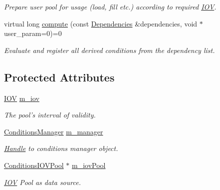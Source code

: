 \begin{DoxyCompactItemize}
\begin{DoxyCompactList}\small\item\em Prepare user pool for usage (load, fill etc.) according to required \hyperlink{class_d_d4hep_1_1_i_o_v}{IOV}. \item\end{DoxyCompactList}\item 
virtual long \hyperlink{class_d_d4hep_1_1_conditions_1_1_user_pool_a117faa4219d68ba50835ac691b538b08}{compute} (const \hyperlink{class_d_d4hep_1_1_conditions_1_1_conditions_dependency_collection}{Dependencies} \&dependencies, void $\ast$user\_\-param=0)=0
\begin{DoxyCompactList}\small\item\em Evaluate and register all derived conditions from the dependency list. \item\end{DoxyCompactList}\end{DoxyCompactItemize}
\subsection*{Protected Attributes}
\begin{DoxyCompactItemize}
\item 
\hyperlink{class_d_d4hep_1_1_i_o_v}{IOV} \hyperlink{class_d_d4hep_1_1_conditions_1_1_user_pool_a5d5c7664cba0150097ebb69b218d44f0}{m\_\-iov}
\begin{DoxyCompactList}\small\item\em The pool's interval of validity. \item\end{DoxyCompactList}\item 
\hyperlink{class_d_d4hep_1_1_conditions_1_1_conditions_manager}{ConditionsManager} \hyperlink{class_d_d4hep_1_1_conditions_1_1_user_pool_a92b13c15de8a8982e6ff8e4f5d24566a}{m\_\-manager}
\begin{DoxyCompactList}\small\item\em \hyperlink{class_d_d4hep_1_1_handle}{Handle} to conditions manager object. \item\end{DoxyCompactList}\item 
\hyperlink{class_d_d4hep_1_1_conditions_1_1_conditions_i_o_v_pool}{ConditionsIOVPool} $\ast$ \hyperlink{class_d_d4hep_1_1_conditions_1_1_user_pool_a916051bc20a354a8c603be0bf0c54cac}{m\_\-iovPool}
\begin{DoxyCompactList}\small\item\em \hyperlink{class_d_d4hep_1_1_i_o_v}{IOV} Pool as data source. \item\end{DoxyCompactList}\end{DoxyCompactItemize}


